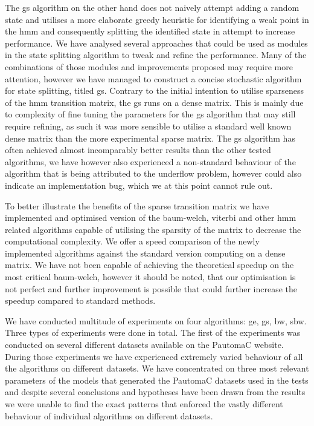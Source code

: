 The \acrlong{gs} algorithm on the other hand does not naively attempt adding a random state and utilises a more elaborate greedy heuristic for identifying a weak point in the \gls{hmm} and consequently splitting the identified state in attempt to increase performance. We have analysed several approaches that could be used as modules in the state splitting algorithm to tweak and refine the performance. Many of the combinations of those modules and improvements proposed may require more attention, however we have managed to construct a concise stochastic algorithm for state splitting, titled \acrlong{gs}. Contrary to the initial intention to utilise sparseness of the \gls{hmm} transition matrix, the \gls{gs} runs on a dense matrix. This is mainly due to complexity of fine tuning the parameters for the \gls{gs} algorithm that may still require refining, as such it was more sensible to utilise a standard well known dense matrix than the more experimental sparse matrix. The \gls{gs} algorithm has often achieved almost incomparably better results than the other tested algorithms, we have however also experienced a non-standard behaviour of the algorithm that is being attributed to the underflow problem, however could also indicate an implementation bug, which we at this point cannot rule out.

To better illustrate the benefits of the sparse transition matrix we have implemented and optimised version of the \gls{baum-welch}, \gls{viterbi} and other \gls{hmm} related algorithms capable of utilising the sparsity of the matrix to decrease the computational complexity. We offer a speed comparison of the newly implemented algorithms against the standard version computing on a dense matrix. We have not been capable of achieving the theoretical speedup on the most critical \gls{baum-welch}, however it should be noted, that our optimisation is not perfect and further improvement is possible that could further increase the speedup compared to standard methods.

We have conducted multitude of experiments on four algorithms: \acrlong{ge}, \acrlong{gs}, \acrlong{bw}, \acrlong{sbw}. Three types of experiments were done in total. The first of the experiments was conducted on several different datasets available on the PautomaC website. During those experiments we have experienced extremely varied behaviour of all the algorithms on different datasets. We have concentrated on three most relevant parameters of the models that generated the PautomaC datasets used in the tests and despite several conclusions and hypotheses have been drawn from the results we were unable to find the exact patterns that enforced the vastly different behaviour of individual algorithms on different datasets.


